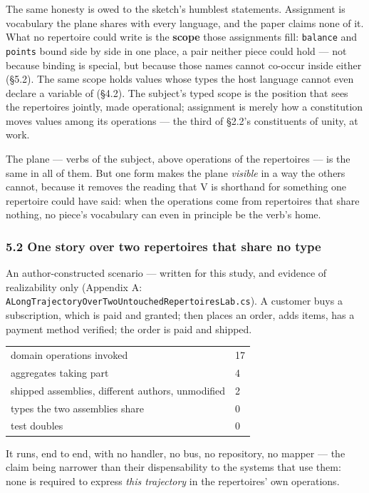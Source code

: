 \documentclass[
]{article}
\newcounter{none} %
\begin{document}
The same honesty is owed to the sketch's humblest statements. Assignment
is vocabulary the plane shares with every language, and the paper claims
none of it. What no repertoire could write is the \textbf{scope} those
assignments fill: \texttt{balance} and \texttt{points} bound side by
side in one place, a pair neither piece could hold --- not because
binding is special, but because those names cannot co-occur inside
either (§5.2). The same scope holds values whose types the host language
cannot even declare a variable of (§4.2). The subject's typed scope is
the position that sees the repertoires jointly, made operational;
assignment is merely how a constitution moves values among its
operations --- the third of §2.2's constituents of unity, at work.

The plane --- verbs of the subject, above operations of the repertoires
--- is the same in all of them. But one form makes the plane
\emph{visible} in a way the others cannot, because it removes the
reading that V is shorthand for something one repertoire could have
said: when the operations come from repertoires that share nothing, no
piece's vocabulary can even in principle be the verb's home.

\subsubsection{5.2 One story over two repertoires that share no
type}\label{one-story-over-two-repertoires-that-share-no-type}

An author-constructed scenario --- written for this study, and evidence
of realizability only (Appendix A:
\texttt{ALongTrajectoryOverTwoUntouchedRepertoiresLab.cs}). A customer
buys a subscription, which is paid and granted; then places an order,
adds items, has a payment method verified; the order is paid and
shipped.

{\def\LTcaptype{none} %
\begin{longtable}[]{@{}ll@{}}
\toprule\noalign{}
\endhead
\bottomrule\noalign{}
\endlastfoot
domain operations invoked & 17 \\
aggregates taking part & 4 \\
shipped assemblies, different authors, unmodified & 2 \\
types the two assemblies share & 0 \\
test doubles & 0 \\
\end{longtable}
}

It runs, end to end, with no handler, no bus, no repository, no mapper
--- the claim being narrower than their dispensability to the systems
that use them: none is required to express \emph{this trajectory} in the
repertoires' own operations.
\end{document}
